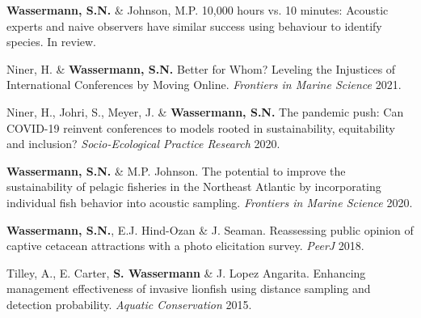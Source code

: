 \documentclass[a4paper]{deedy-resume} %
\begin{document}
\begin{flushleft}
\begin{tightitemize}
\item \textbf{Wassermann, S.N.} \& Johnson, M.P. 10,000 hours vs. 10 minutes: Acoustic experts and naive observers have similar success using behaviour to identify species. In review.
\item Niner, H. \& \textbf{Wassermann, S.N.} Better for Whom? Leveling the Injustices of International Conferences by Moving Online. \textit{Frontiers in Marine Science} 2021.
\item Niner, H., Johri, S., Meyer, J. \& \textbf{Wassermann, S.N.} The pandemic push: Can COVID-19 reinvent conferences to models rooted in sustainability, equitability and inclusion? \textit{Socio-Ecological Practice Research} 2020.
\item \textbf{Wassermann, S.N.} \& M.P. Johnson. The potential to improve the sustainability of pelagic fisheries in the Northeast Atlantic by incorporating individual fish behavior into acoustic sampling. \textit{Frontiers in Marine Science} 2020. 
\item \textbf{Wassermann, S.N.}, E.J. Hind-Ozan \& J. Seaman. 
Reassessing public opinion of captive cetacean attractions with a photo elicitation survey. \textit{PeerJ} 2018.
\item Tilley, A., E. Carter, \textbf{S. Wassermann} \& J. Lopez Angarita. Enhancing management effectiveness of invasive lionfish using distance sampling and detection probability. \textit{Aquatic Conservation} 2015.
\end{tightitemize}

\sectionspace


\end{flushleft}
\end{document}

